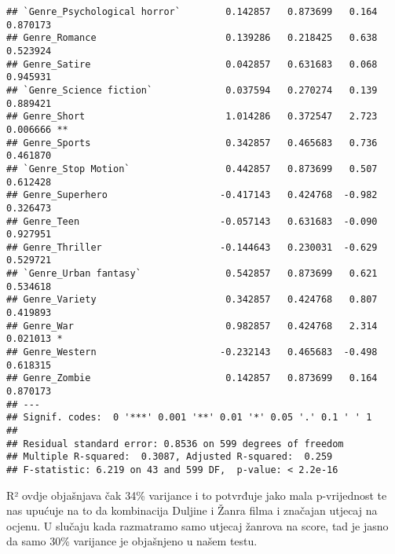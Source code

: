 \documentclass[
]{article}
\begin{document}
\begin{verbatim}
## `Genre_Psychological horror`        0.142857   0.873699   0.164 0.870173    
## Genre_Romance                       0.139286   0.218425   0.638 0.523924    
## Genre_Satire                        0.042857   0.631683   0.068 0.945931    
## `Genre_Science fiction`             0.037594   0.270274   0.139 0.889421    
## Genre_Short                         1.014286   0.372547   2.723 0.006666 ** 
## Genre_Sports                        0.342857   0.465683   0.736 0.461870    
## `Genre_Stop Motion`                 0.442857   0.873699   0.507 0.612428    
## Genre_Superhero                    -0.417143   0.424768  -0.982 0.326473    
## Genre_Teen                         -0.057143   0.631683  -0.090 0.927951    
## Genre_Thriller                     -0.144643   0.230031  -0.629 0.529721    
## `Genre_Urban fantasy`               0.542857   0.873699   0.621 0.534618    
## Genre_Variety                       0.342857   0.424768   0.807 0.419893    
## Genre_War                           0.982857   0.424768   2.314 0.021013 *  
## Genre_Western                      -0.232143   0.465683  -0.498 0.618315    
## Genre_Zombie                        0.142857   0.873699   0.164 0.870173    
## ---
## Signif. codes:  0 '***' 0.001 '**' 0.01 '*' 0.05 '.' 0.1 ' ' 1
## 
## Residual standard error: 0.8536 on 599 degrees of freedom
## Multiple R-squared:  0.3087, Adjusted R-squared:  0.259 
## F-statistic: 6.219 on 43 and 599 DF,  p-value: < 2.2e-16
\end{verbatim}

R² ovdje objašnjava čak 34\% varijance i to potvrđuje jako mala
p-vrijednost te nas upućuje na to da kombinacija Duljine i Žanra filma i
značajan utjecaj na ocjenu. U slučaju kada razmatramo samo utjecaj
žanrova na score, tad je jasno da samo 30\% varijance je objašnjeno u
našem testu.
\end{document}
